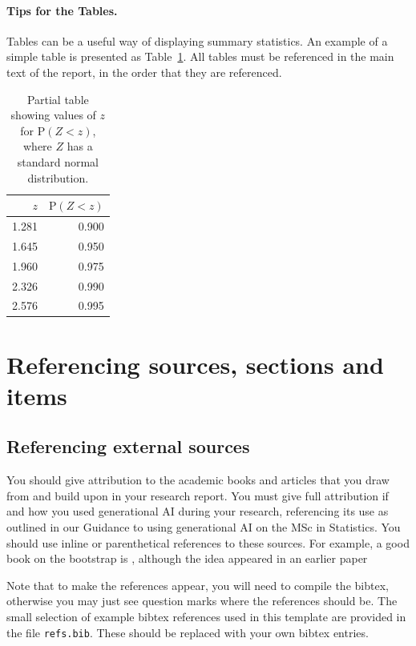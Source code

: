 \paragraph{Tips for the Tables.} Tables can be a useful way of displaying summary statistics. An example of a simple table is presented as Table~\ref{tab:normal}. All tables must be referenced in the main text of the report, in the order that they are referenced.

\begin{table}[ht]
\centering
\begin{tabular}{rr}
  \hline
    $z$& $\textrm{P}(Z < z)$ \\
  \hline
    1.281& 0.900\\
    1.645& 0.950\\
    1.960& 0.975\\
    2.326& 0.990 \\
    2.576& 0.995 \\
   \hline
\end{tabular}
    \caption{Partial table showing values of $z$ for $\textrm{P}(Z < z)$, 
    where $Z$ has a standard normal distribution.}
    \label{tab:normal}
\end{table}



\section{Referencing sources, sections and items} \label{sec:referencing}

\subsection{Referencing external sources}

You should give attribution to the academic books and articles that you draw from and build upon in your research report. You must give full attribution if and how you used generational AI during your research, referencing its use as outlined in our Guidance to using generational AI on the MSc in Statistics. You should use inline or parenthetical references to these sources. For example, a good book on the bootstrap is
, although the idea appeared in an earlier paper

Note that to make the references appear, you will need to compile the bibtex, otherwise you may just see question marks where the references should be. The small selection of example bibtex references used in this template are provided in the file \texttt{refs.bib}. These should be replaced with your own bibtex entries.
 
